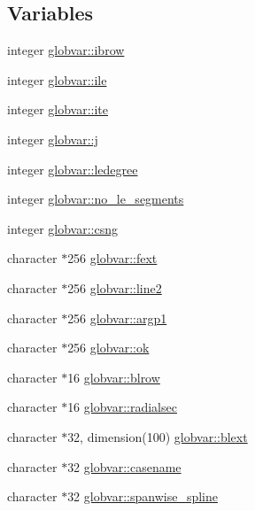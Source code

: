 \subsection*{Variables}
\begin{DoxyCompactItemize}
\item 
integer \hyperlink{namespaceglobvar_a074233db9e9693042a79a9e4cd4f84e2}{globvar\+::ibrow}
\item 
integer \hyperlink{namespaceglobvar_aefeb81e8846810feb44bb79f95cac5c2}{globvar\+::ile}
\item 
integer \hyperlink{namespaceglobvar_a67308a23e61fb67077fcb6216e72bc84}{globvar\+::ite}
\item 
integer \hyperlink{namespaceglobvar_aa6b683519cf0d2993847908919dd2d72}{globvar\+::j}
\item 
integer \hyperlink{namespaceglobvar_ab47e00ad68c86a9aac86e082da7398f1}{globvar\+::ledegree}
\item 
integer \hyperlink{namespaceglobvar_a64988ba2eed57cebc3d95939e33ee75e}{globvar\+::no\+\_\+le\+\_\+segments}
\item 
integer \hyperlink{namespaceglobvar_a5c850302345bc4b2d45af2d4bb80f58f}{globvar\+::csng}
\item 
character $\ast$256 \hyperlink{namespaceglobvar_a91c6656f75994719c2ef6ca7d7b88ded}{globvar\+::fext}
\item 
character $\ast$256 \hyperlink{namespaceglobvar_a1620db6ffc17c057934b90f70421dd96}{globvar\+::line2}
\item 
character $\ast$256 \hyperlink{namespaceglobvar_a3ee916788a2f55473d7d6dd7ba5137f7}{globvar\+::argp1}
\item 
character $\ast$256 \hyperlink{namespaceglobvar_a61ebbf94ac2ff67042612526d08b69f5}{globvar\+::ok}
\item 
character $\ast$16 \hyperlink{namespaceglobvar_ae058016a63919ba09dda0290e83e60a0}{globvar\+::blrow}
\item 
character $\ast$16 \hyperlink{namespaceglobvar_a62eb55ad192fba73ef6d49482206212e}{globvar\+::radialsec}
\item 
character $\ast$32, dimension(100) \hyperlink{namespaceglobvar_afebc24dd143d18989fbeb7223a277ab8}{globvar\+::blext}
\item 
character $\ast$32 \hyperlink{namespaceglobvar_a0a6c526cbc0a41ebd6f3667a0a9183ba}{globvar\+::casename}
\item 
character $\ast$32 \hyperlink{namespaceglobvar_a6a1dfe25b49d1fa165e1f63466b92629}{globvar\+::spanwise\+\_\+spline}
\item 

\end{DoxyCompactItemize}
